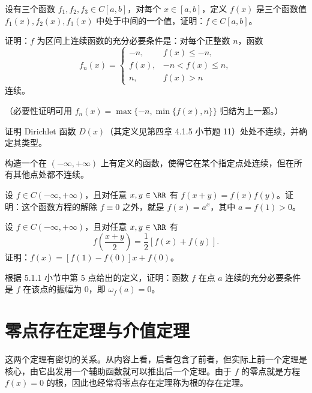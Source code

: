 \begin{xexercise}[6]
设有三个函数 $f_1,f_2,f_3\in C[a,b]$，对每个 $x\in[a,b]$，定义 $f(x)$ 是三个函数值 $f_1(x),f_2(x),f_3(x)$ 中处于中间的一个值，证明：$f\in C[a,b]$。
\end{xexercise}

\begin{xexercise}[7]
证明：$f$ 为区间上连续函数的充分必要条件是：对每个正整数 $n$，函数
  \[
    f_n(x)=\begin{cases}
      -n,&f(x)\le-n,\\
      f(x),&-n<f(x)\le n,\\
      n,&f(x)>n
    \end{cases}
  \]
  连续。

  （必要性证明可用 $f_n(x)=\max\{-n,\min\{f(x),n\}\}$ 归结为上一题。）
\end{xexercise}

\begin{xexercise}[8]
证明 Dirichlet 函数 $D(x)$（其定义见第四章 4.1.5 小节题 11）处处不连续，并确定其类型。
\end{xexercise}

\begin{xexercise}[9]
构造一个在 $(-\infty,+\infty)$ 上有定义的函数，使得它在某个指定点处连续，但在所有其他点处都不连续。
\end{xexercise}

\begin{xexercise}[10]
设 $f\in C(-\infty,+\infty)$，且对任意 $x,y\in\RR$ 有 $f(x+y)=f(x)f(y)$。证明：这个函数方程的解除 $f\equiv0$ 之外，就是 $f(x)=a^x$，其中 $a=f(1)>0$。
\end{xexercise}

\begin{xexercise}[11]
设 $f\in C(-\infty,+\infty)$，且对任意 $x,y\in\RR$ 有
  \[
    f\left(\frac{x+y}{2}\right)=\frac12[f(x)+f(y)].
  \]
  证明：$f(x)=[f(1)-f(0)]x+f(0)$。
\end{xexercise}

\begin{xexercise}[12]
根据 5.1.1 小节中第 5 点给出的定义，证明：函数 $f$ 在点 $a$ 连续的充分必要条件是 $f$ 在该点的振幅为 0，即 $\omega_f(a)=0$。
\end{xexercise}

\section{零点存在定理与介值定理}

这两个定理有密切的关系。从内容上看，后者包含了前者，但实际上前一个定理是核心，由它出发用一个辅助函数就可以推出后一个定理。由于 $f$ 的零点就是方程 $f(x)=0$ 的根，因此也经常将零点存在定理称为根的存在定理。

